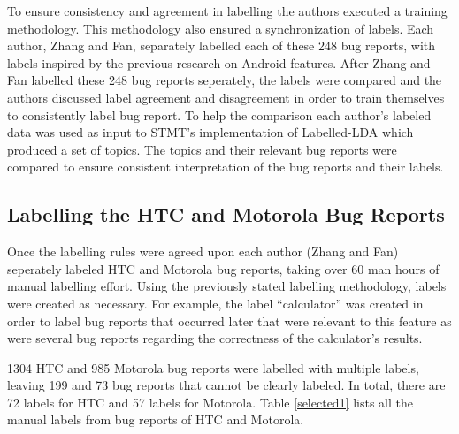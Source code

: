 \documentclass[10pt, conference, compsocconf]{IEEEtran}
\begin{document}
To ensure consistency and agreement in labelling the authors executed a training
methodology. This methodology also ensured a synchronization of labels.
Each author, Zhang and Fan, separately labelled each of these 248 bug reports, 
with labels inspired by the previous research on Android
features. 
After Zhang and Fan labelled these 248 bug reports seperately, the
labels were compared and the authors discussed label agreement and
disagreement in order to train themselves to consistently label bug
report.
To help the comparison each author’s labeled data was used as input to
 STMT's implementation of Labelled-LDA which produced a set of topics.
The topics and their relevant bug reports were compared to ensure
consistent interpretation of the bug reports and their labels.




\subsection{Labelling the HTC and Motorola Bug Reports}

Once the labelling rules were agreed upon each author (Zhang and Fan)
seperately labeled HTC and Motorola bug reports, taking over 60 man
hours of manual labelling effort.
Using the previously stated labelling methodology, labels were created as necessary.
For example, the label ``calculator'' was created in order to label
bug reports that occurred later that were relevant to this feature as
were several bug reports regarding the correctness of the
calculator's results. 


1304 HTC and 985 Motorola bug reports were labelled with multiple
labels, leaving 199 and 73 bug reports that cannot be clearly labeled.
In total, there are 72 labels for HTC and 57 labels for Motorola.
Table \ref{selected1} lists all the manual labels from bug reports of HTC
and Motorola.
\end{document}
